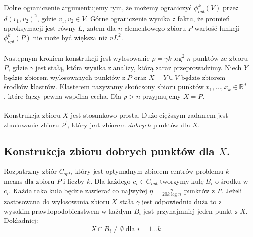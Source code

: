 Dolne ograniczenie argumentujemy tym, że możemy ograniczyć $\phi_{opt}^{k}(V)$ przez $d(v_{1}, v_{2})^2$, gdzie $v_{1}, v_{2} \in V$.
Górne ograniczenie wynika z faktu, że promień aproksymacji jest równy $L$, zatem dla $n$ elementowego zbioru $P$ wartość funkcji $\phi_{opt}^{k}(P)$ nie może być większa niż $nL^2$.
\\~\\
Następnym krokiem konstrukcji jest wylosowanie $\rho = \gamma k \log^{2} n$ punktów ze zbioru $P$, gdzie $\gamma$ jest stałą, która wynika z analizy, którą zaraz przeprowadzimy.
Niech $Y$ będzie zbiorem wylosowanych punktów z $P$ oraz $X = Y \cup V$ będzie zbiorem środków klastrów.
Klasterem nazywamy skończony zbioru punktów $x_{1}, \dots, x_{k} \in \mathbb{R}^{d}$, które łączy pewna wspólna cecha.
Dla $\rho > n$ przyjmujemy $X = P$.
\\~\\
Konstrukcja zbioru $X$ jest stosunkowo prosta.
Dużo cięższym zadaniem jest zbudowanie zbioru $P^{'}$, który jest zbiorem \textit{dobrych} punktów dla $X$.

\subsection{Konstrukcja zbioru dobrych punktów dla $X$.}

Rozpatrzmy zbiór $C_{opt}$, który jest optymalnym zbiorem centrów problemu $k$-means dla zbioru $P$ i liczby $k$.
Dla każdego $c_{i} \in C_{opt}$ tworzymy kulę $B_{i}$ o środku w $c_{i}$.
Każda taka kula będzie zawierać co najwyżej $\eta = \frac{n}{20k \log n}$ punktów z $P$.
Jeżeli zastosowana do wylosowania zbioru $X$ stała $\gamma$ jest odpowiednio duża to z wysokim prawdopodobieństwem w każdym $B_{i}$ jest przynajmniej jeden punkt z $X$.
Dokładniej:
\begin{equation}
    X \cap B_{i} \neq \emptyset \text{ dla } i = 1 \dots k
\end{equation}

